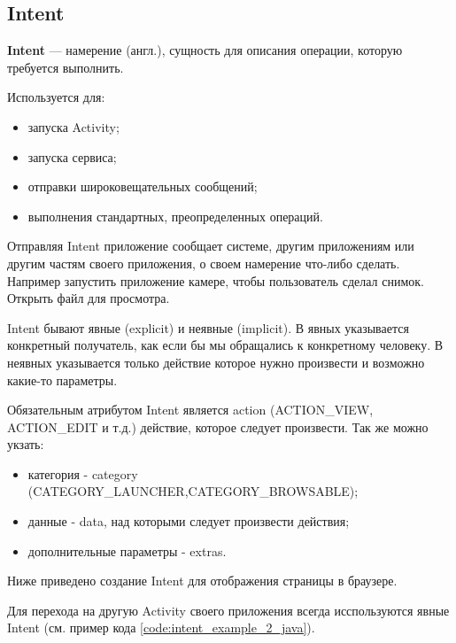 \subsection{Intent}
\textbf{Intent} --- намерение (англ.), сущность для описания операции, которую требуется выполнить.

Используется для:
\begin{itemize}
	\item запуска Activity;
	\item запуска сервиса;
	\item отправки широковещательных сообщений;
	\item выполнения стандартных, преопределенных операций.
\end{itemize}

Отправляя Intent приложение сообщает системе, другим приложениям или другим частям своего приложения, о своем намерение что-либо сделать. Например запустить приложение камере, чтобы пользователь сделал снимок. Открыть файл для просмотра.

Intent бывают явные (explicit) и неявные (implicit). В явных указывается конкретный получатель, как если бы мы обращались к конкретному человеку. В неявных указывается только действие которое нужно произвести и возможно какие-то параметры.

Обязательным атрибутом Intent является action (ACTION\_VIEW, \newline ACTION\_EDIT и т.д.) действие, которое следует произвести. Так же можно укзать:
\begin{itemize}
	\item категория - category (CATEGORY\_LAUNCHER,\newline CATEGORY\_BROWSABLE);
	\item данные - data, над которыми следует произвести действия;
	\item дополнительные параметры - extras.
\end{itemize}

Ниже приведено создание Intent для отображения страницы в браузере.
	
	
Для перехода на другую Activity своего приложения всегда исспользуются явные Intent (см. пример кода \ref{code:intent_example_2_java}).
	
	
